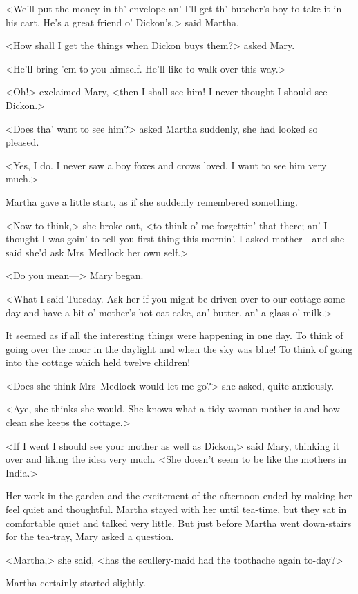 <We'll put the money in th' envelope an' I'll get th' butcher's boy to take it in his cart. He's a great friend o' Dickon's,> said Martha.

<How shall I get the things when Dickon buys them?> asked Mary.

<He'll bring 'em to you himself. He'll like to walk over this way.>

<Oh!> exclaimed Mary, <then I shall see him! I never thought I should see Dickon.>

<Does tha' want to see him?> asked Martha suddenly, she had looked so pleased.

<Yes, I do. I never saw a boy foxes and crows loved. I want to see him very much.>

Martha gave a little start, as if she suddenly remembered something.

<Now to think,> she broke out, <to think o' me forgettin' that there; an' I thought I was goin' to tell you first thing this mornin'. I asked mother—and she said she'd ask Mrs~Medlock her own self.>

<Do you mean—> Mary began.

<What I said Tuesday. Ask her if you might be driven over to our cottage some day and have a bit o' mother's hot oat cake, an' butter, an' a glass o' milk.>

It seemed as if all the interesting things were happening in one day. To think of going over the moor in the daylight and when the sky was blue! To think of going into the cottage which held twelve children!

<Does she think Mrs~Medlock would let me go?> she asked, quite anxiously.

<Aye, she thinks she would. She knows what a tidy woman mother is and how clean she keeps the cottage.>

<If I went I should see your mother as well as Dickon,> said Mary, thinking it over and liking the idea very much. <She doesn't seem to be like the mothers in India.>

Her work in the garden and the excitement of the afternoon ended by making her feel quiet and thoughtful. Martha stayed with her until tea-time, but they sat in comfortable quiet and talked very little. But just before Martha went down-stairs for the tea-tray, Mary asked a question.

<Martha,> she said, <has the scullery-maid had the toothache again to-day?>

Martha certainly started slightly.

